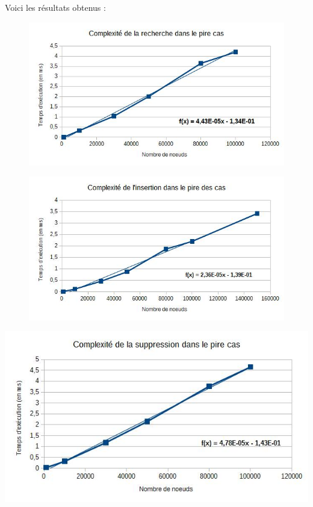 \documentclass{report}
\begin{document}
Voici les résultats obtenus :

\begin{figure}[h]
\includegraphics[scale=0.65]{images/rech.jpg}
\end{figure}
\begin{figure}[h]
\includegraphics[scale=0.65]{images/ins.jpg}
\end{figure}
\includegraphics[scale=0.65]{images/supp.jpg}
\end{document}
